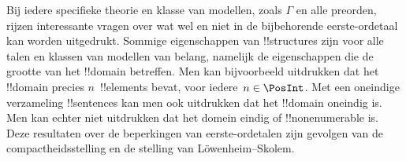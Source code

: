 \documentclass[../../../include/open-logic-section]{subfiles}
\begin{document}
Bij iedere specifieke theorie en klasse van modellen, zoals $\Gamma$
en alle preorden, rijzen interessante vragen over wat wel en niet in de
bijbehorende eerste-ordetaal kan worden uitgedrukt. Sommige
eigenschappen van !!{structure}s zijn voor alle talen en klassen van
modellen van belang, namelijk de eigenschappen die de grootte van het
!!{domain} betreffen. Men kan bijvoorbeeld uitdrukken dat het
!!{domain} precies $n$~!!{element}s bevat, voor iedere~$n \in \PosInt$.
Met een
oneindige verzameling !!{sentence}s kan men ook uitdrukken dat het
!!{domain} oneindig is. Men kan echter niet uitdrukken dat het domein
eindig of !!{nonenumerable} is. Deze resultaten over de beperkingen van
eerste-ordetalen zijn gevolgen van de compactheidsstelling en de
stelling van L\"owenheim--Skolem.
\end{document}
